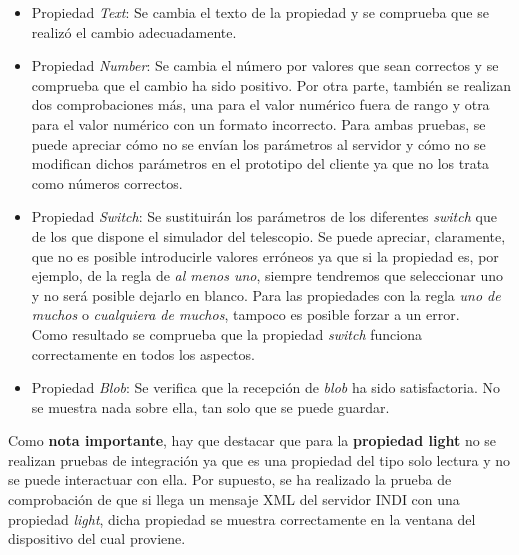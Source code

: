 \begin{itemize}
  \item Propiedad \textit{Text}: Se cambia el texto de la propiedad y se comprueba que se realizó el cambio adecuadamente.
  \item Propiedad \textit{Number}: Se cambia el número por valores que sean correctos y se comprueba que el cambio ha sido positivo. Por otra parte, también se realizan dos comprobaciones más, una para el valor numérico fuera de rango y otra para el valor numérico con un formato incorrecto. Para ambas pruebas, se puede apreciar cómo no se envían los parámetros al servidor y cómo no se modifican dichos parámetros en el prototipo del cliente ya que no los trata como números correctos.
  \item Propiedad \textit{Switch}: Se sustituirán los parámetros de los diferentes \textit{switch} que de los que dispone el simulador del telescopio. Se puede apreciar, claramente, que no es posible introducirle valores erróneos ya que si la propiedad es, por ejemplo, de la regla de \textit{al menos uno}, siempre tendremos que seleccionar uno y no será posible dejarlo en blanco. Para las propiedades con la regla \textit{uno de muchos} o \textit{cualquiera de muchos}, tampoco es posible forzar a un error.\\
  Como resultado se comprueba que la propiedad \textit{switch} funciona correctamente en todos los aspectos.
  \item Propiedad \textit{Blob}: Se verifica que la recepción de \textit{blob} ha sido satisfactoria. No se muestra nada sobre ella, tan solo que se puede guardar.
\end{itemize}

Como \textbf{nota importante}, hay que destacar que para la \textbf{propiedad light} no se realizan pruebas de integración ya que es una propiedad del tipo solo lectura y no se puede interactuar con ella. Por supuesto, se ha realizado la prueba de comprobación de que si llega un mensaje XML del servidor INDI con una propiedad \textit{light}, dicha propiedad se muestra correctamente en la ventana del dispositivo del cual proviene.

